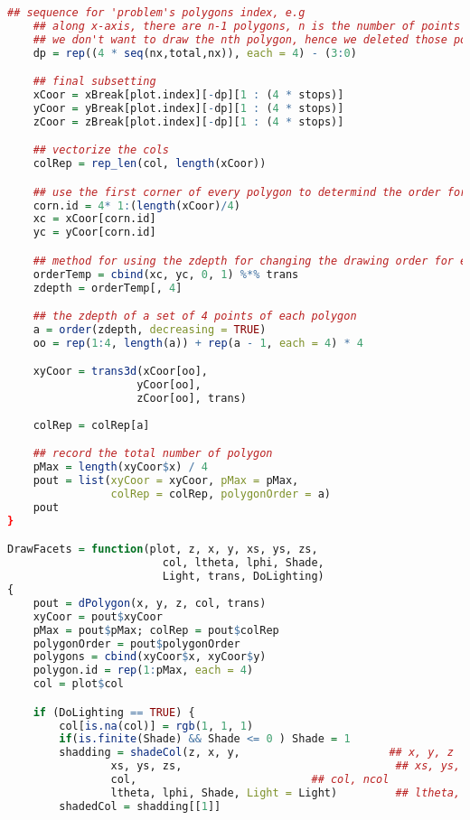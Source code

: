 \begin{lstlisting}[language = R]
    ## sequence for 'problem's polygons index, e.g
    ## along x-axis, there are n-1 polygons, n is the number of points in x direction
    ## we don't want to draw the nth polygon, hence we deleted those polygon
    dp = rep((4 * seq(nx,total,nx)), each = 4) - (3:0)

    ## final subsetting
    xCoor = xBreak[plot.index][-dp][1 : (4 * stops)]
    yCoor = yBreak[plot.index][-dp][1 : (4 * stops)]
    zCoor = zBreak[plot.index][-dp][1 : (4 * stops)]

    ## vectorize the cols
    colRep = rep_len(col, length(xCoor))

    ## use the first corner of every polygon to determind the order for drawing
    corn.id = 4* 1:(length(xCoor)/4)
    xc = xCoor[corn.id]
    yc = yCoor[corn.id]

    ## method for using the zdepth for changing the drawing order for every polygon
    orderTemp = cbind(xc, yc, 0, 1) %*% trans 
    zdepth = orderTemp[, 4]

    ## the zdepth of a set of 4 points of each polygon
    a = order(zdepth, decreasing = TRUE)
    oo = rep(1:4, length(a)) + rep(a - 1, each = 4) * 4

    xyCoor = trans3d(xCoor[oo],
                    yCoor[oo],
                    zCoor[oo], trans)
                    
    colRep = colRep[a]

    ## record the total number of polygon
    pMax = length(xyCoor$x) / 4
    pout = list(xyCoor = xyCoor, pMax = pMax, 
                colRep = colRep, polygonOrder = a)
    pout
}

DrawFacets = function(plot, z, x, y, xs, ys, zs, 
                        col, ltheta, lphi, Shade,
                        Light, trans, DoLighting)
{
    pout = dPolygon(x, y, z, col, trans)
    xyCoor = pout$xyCoor
    pMax = pout$pMax; colRep = pout$colRep
    polygonOrder = pout$polygonOrder
    polygons = cbind(xyCoor$x, xyCoor$y)
    polygon.id = rep(1:pMax, each = 4)
    col = plot$col

    if (DoLighting == TRUE) {
        col[is.na(col)] = rgb(1, 1, 1)
        if(is.finite(Shade) && Shade <= 0 ) Shade = 1
        shadding = shadeCol(z, x, y,                       ## x, y, z
                xs, ys, zs,                                 ## xs, ys, zs 
                col,                           ## col, ncol
                ltheta, lphi, Shade, Light = Light)         ## ltheta, lphi, Shade(not shade)
        shadedCol = shadding[[1]]
        

\end{lstlisting}
